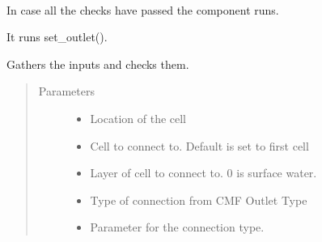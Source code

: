 \documentclass[letterpaper,10pt,english]{sphinxmanual}
\begin{document}
\begin{fulllineitems}
\begin{fulllineitems}
\label{\detokenize{cmf:livestock.components.comp_cmf.CMFOutlet.run}}~
\begin{DUlineblock}{0em}
\item[] In case all the checks have passed the component runs.
\item[] It runs set\_outlet().
\end{DUlineblock}

\end{fulllineitems}


\begin{fulllineitems}
\label{\detokenize{cmf:livestock.components.comp_cmf.CMFOutlet.run_checks}}
Gathers the inputs and checks them.
\begin{quote}\begin{description}
\item[{Parameters}] \leavevmode\begin{itemize}
\item {} 
 \textendash{} Location of the cell

\item {} 
 \textendash{} Cell to connect to. Default is set to first cell

\item {} 
 \textendash{} Layer of cell to connect to. 0 is surface water.

\item {} 
 \textendash{} Type of connection from CMF Outlet Type

\item {} 
 \textendash{} Parameter for the connection type.

\end{itemize}

\end{description}\end{quote}

\end{fulllineitems}



\end{fulllineitems}
\end{document}
